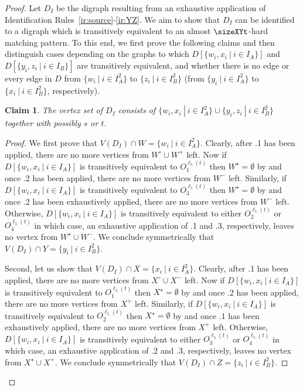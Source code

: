 \documentclass[a4paper,11pt]{article}
\theoremstyle{plain}
\newtheorem{claim}[theorem]{Claim}
\newtheorem{identification rule}{Identification Rule}
\theoremstyle{definition}
\theoremstyle{remark}
\newenvironment{claimproof}{\begin{proof}\renewcommand{\qedsymbol}{\claimqed}}{\end{proof}\renewcommand{\qedsymbol}{\plainqed}}
\let\plainqed\qedsymbol
\newcommand{\claimqed}{$\lrcorner$}
\begin{document}
\begin{proof}
Let $D_I$ be the digraph resulting from an exhaustive application of Identification Rules~\ref{ir:source}-\ref{ir:YZ}. 
We aim to show that $D_I$ can be identified to a digraph which is transitively equivalent to an almost $\sizeXYt$-hard matching pattern. To this end, we first prove the following claims and then
distinguish cases depending on the graphs to which $D[\{w_i,x_i~|~i \in I_A\}]$ and $D[\{y_i,z_i~|~i \in I_B\}]$ are transitively equivalent, and whether there is no edge or every edge in $D$ from $\{w_i~|~i \in I_A^2\}$ to $\{z_i~|~i \in I_B^2\}$ (from $\{y_i~|~i \in I_A^2\}$ to $\{x_i~|~i \in I_B^2\}$, respectively).

\begin{claim}
\label{clm:vertexsetDI}
The vertex set of $D_I$ consists of $\{w_i,x_i~|~i \in I_A^2\} \cup \{y_i,z_i~|~i \in I_B^2\}$ together with possibly $s$ or $t$. 
\end{claim}

\begin{claimproof}
We first prove that $V(D_I) \cap W = \{w_i~|~i \in I_A^2\}$. 
Clearly, after .1 has been applied, there are no more vertices from $W^\circ \cup W^+$ left.
Now if $D[\{w_i,x_i~|~i \in I_A\}]$ is transitively equivalent to $O_1^{\ell_5(t)}$
then $W^\star = \emptyset$ by  and once .2 has been applied, there are no more vertices from $W^-$ left.
Similarly, if $D[\{w_i,x_i~|~i \in I_A\}]$ is transitively equivalent to $O_3^{\ell_5(t)}$
then $W^\star = \emptyset$ by  and once .2 has been exhaustively applied, 
there are no more vertices from $W^-$ left. 
Otherwise, $D[\{w_i,x_i~|~i \in I_A\}]$ is transitively equivalent to either $O_2^{\ell_5(t)}$ or $O_4^{\ell_5(t)}$ in which case, an exhaustive application of .1 and .3, respectively, leaves no vertex from $W^\star \cup W^-$.
We conclude symmetrically that $V(D_I) \cap Y = \{y_i~|~i \in I_B^2\}$.

Second, let us show that $V(D_I) \cap X = \{x_i~|~i \in I_A^2\}$.
Clearly, after .1 has been applied, there are no more vertices from $X^\circ \cup X^-$ left. 
Now if $D[\{w_i,x_i~|~i \in I_A\}]$ is transitively equivalent to $O_1^{\ell_5(t)}$
then $X^\star = \emptyset$ by  and once .2 has been applied, there are no more vertices from $X^+$ left.
Similarly, if $D[\{w_i,x_i~|~i \in I_A\}]$ is transitively equivalent to $O_2^{\ell_5(t)}$
then $X^\star = \emptyset$ by  and once .1 has been exhaustively applied, 
there are no more vertices from $X^+$ left. 
Otherwise, $D[\{w_i,x_i~|~i \in I_A\}]$ is transitively equivalent to either $O_3^{\ell_5(t)}$ or $O_4^{\ell_5(t)}$ in which case, an exhaustive application of .2 and .3, respectively, leaves no vertex from $X^\star \cup X^+$.
We conclude symmetrically that $V(D_I) \cap Z = \{z_i~|~i \in I_B^2\}$.
\end{claimproof}


\end{proof}
\end{document}
